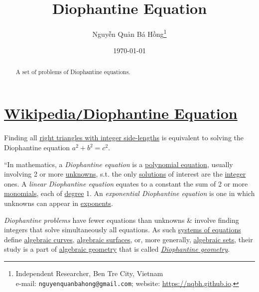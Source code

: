 \documentclass{article}
\title{Diophantine Equation}
\author{\selectlanguage{vietnamese} Nguyễn Quản Bá Hồng\footnote{Independent Researcher, Ben Tre City, Vietnam\\e-mail: \texttt{nguyenquanbahong@gmail.com}; website: \url{https://nqbh.github.io}.}}
\date{\today}
\numberwithin{equation}{section}
\begin{document}
\maketitle
{}
\begin{abstract}
	A set of problems of Diophantine equations.
\end{abstract}

\tableofcontents
{}


\section{\href{https://en.wikipedia.org/wiki/Diophantine_equation}{Wikipedia\texttt{/}Diophantine Equation}}
\textsf{Finding all \href{https://en.wikipedia.org/wiki/Pythagorean_triple}{right triangles with integer side-lengths} is equivalent to solving the Diophantine equation $a^2 + b^2 = c^2$.}

``In mathematics, a \textit{Diophantine equation} is a \href{https://en.wikipedia.org/wiki/Polynomial_equation}{polynomial equation}, usually involving 2 or more \href{https://en.wikipedia.org/wiki/Unknown_(mathematics)}{unknowns}, s.t. the only \href{https://en.wikipedia.org/wiki/Equation_solving}{solutions} of interest are the \href{https://en.wikipedia.org/wiki/Integer}{integer} ones. A \textit{linear Diophantine equation} equates to a constant the sum of 2 or more \href{https://en.wikipedia.org/wiki/Monomials}{monomials}, each of \href{https://en.wikipedia.org/wiki/Degree_of_a_polynomial}{degree} 1. An \textit{exponential Diophantine equation} is one in which unknowns can appear in \href{https://en.wikipedia.org/wiki/Exponent}{exponents}.

\textit{Diophantine problems} have fewer equations than unknowns \& involve finding integers that solve simultaneously all equations. As such \href{https://en.wikipedia.org/wiki/Systems_of_equations}{systems of equations} define \href{https://en.wikipedia.org/wiki/Algebraic_curve}{algebraic curves}, \href{https://en.wikipedia.org/wiki/Algebraic_surface}{algebraic surfaces}, or, more generally, \href{https://en.wikipedia.org/wiki/Algebraic_set}{algebraic sets}, their study is a part of \href{https://en.wikipedia.org/wiki/Algebraic_geometry}{algebraic geometry} that is called \href{https://en.wikipedia.org/wiki/Diophantine_geometry}{\textit{Diophantine geometry}}.
\end{document}
